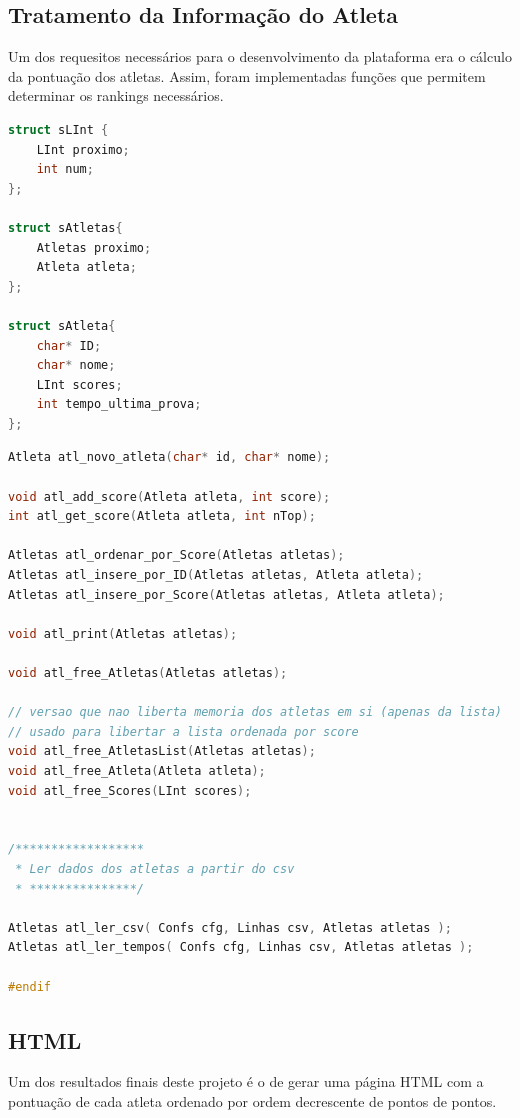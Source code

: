 \documentclass[11pt, a4paper, oneside]{article}
\begin{document}
\subsection{Tratamento da Informação do Atleta}

Um dos requesitos necessários para o desenvolvimento da plataforma era o cálculo da pontuação dos atletas. 
Assim, foram implementadas funções que permitem determinar os rankings necessários.
\begin{lstlisting}[language=C, caption={Estrutura de um atleta.}]
struct sLInt {
    LInt proximo;
    int num;
};

struct sAtletas{
    Atletas proximo;
    Atleta atleta;
};

struct sAtleta{
    char* ID;
    char* nome;
    LInt scores;
    int tempo_ultima_prova;
};
\end{lstlisting}

\begin{lstlisting}[language=C, caption={Assinatura das funções.}]
Atleta atl_novo_atleta(char* id, char* nome);

void atl_add_score(Atleta atleta, int score);
int atl_get_score(Atleta atleta, int nTop);

Atletas atl_ordenar_por_Score(Atletas atletas);
Atletas atl_insere_por_ID(Atletas atletas, Atleta atleta);
Atletas atl_insere_por_Score(Atletas atletas, Atleta atleta);

void atl_print(Atletas atletas);

void atl_free_Atletas(Atletas atletas);

// versao que nao liberta memoria dos atletas em si (apenas da lista)
// usado para libertar a lista ordenada por score
void atl_free_AtletasList(Atletas atletas);
void atl_free_Atleta(Atleta atleta);
void atl_free_Scores(LInt scores);


/******************
 * Ler dados dos atletas a partir do csv
 * ***************/

Atletas atl_ler_csv( Confs cfg, Linhas csv, Atletas atletas );
Atletas atl_ler_tempos( Confs cfg, Linhas csv, Atletas atletas );

#endif
\end{lstlisting}

\newpage
\subsection{HTML}

Um dos resultados finais deste projeto é o de gerar uma página HTML com a pontuação de cada atleta ordenado por ordem decrescente de pontos de pontos. 
\end{document}
